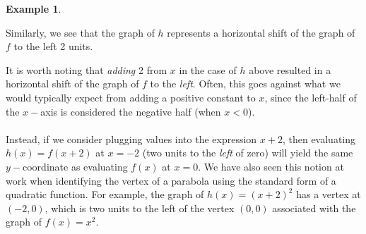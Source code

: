 \documentclass[11pt]{book}
\theoremstyle{definition}  %
\newtheorem{example}{Example}[chapter]
\begin{document}
\begin{example}
\begin{multicols}{2}
\begin{center}
\end{center}
\end{multicols}
Similarly, we see that the graph of $h$ represents a horizontal shift of the graph of $f$ to the left 2 units.
\end{example}
It is worth noting that \textit{adding} 2 from $x$ in the case of $h$ above resulted in a horizontal shift of the graph of $f$ to the \textit{left}.  Often, this goes against what we would typically expect from adding a positive constant to $x$, since the left-half of the $x-$axis is considered the negative half (when $x<0$).\\
~\\
Instead, if we consider plugging values into the expression $x+2$, then evaluating $h(x)=f(x+2)$ at $x=-2$ (two units to the \textit{left} of zero) will yield the same $y-$coordinate as evaluating $f(x)$ at $x=0$.  We have also seen this notion at work when identifying the vertex of a parabola using the standard form of a quadratic function.  For example, the graph of $h(x)=(x+2)^2$ has a vertex at $(-2,0)$, which is two units to the left of the vertex $(0,0)$ associated with the graph of $f(x)=x^2$.\\
~\\
\end{document}
